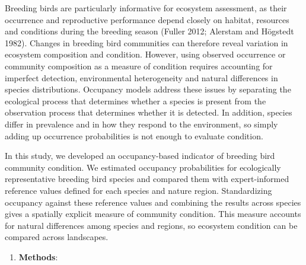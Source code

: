 \documentclass[
  letterpaper,
  DIV=11,
  numbers=noendperiod]{scrartcl}
\providecommand{\tightlist}{%
  \setlength{\itemsep}{0pt}\setlength{\parskip}{0pt}}
\begin{document}
Breeding birds are particularly informative for ecosystem assessment, as
their occurrence and reproductive performance depend closely on habitat,
resources and conditions during the breeding season (Fuller 2012;
Alerstam and Högstedt 1982). Changes in breeding bird communities can
therefore reveal variation in ecosystem composition and condition.
However, using observed occurrence or community composition as a measure
of condition requires accounting for imperfect detection, environmental
heterogeneity and natural differences in species distributions.
Occupancy models address these issues by separating the ecological
process that determines whether a species is present from the
observation process that determines whether it is detected. In addition,
species differ in prevalence and in how they respond to the environment,
so simply adding up occurrence probabilities is not enough to evaluate
condition.

In this study, we developed an occupancy-based indicator of breeding
bird community condition. We estimated occupancy probabilities for
ecologically representative breeding bird species and compared them with
expert-informed reference values defined for each species and nature
region. Standardizing occupancy against these reference values and
combining the results across species gives a spatially explicit measure
of community condition. This measure accounts for natural differences
among species and regions, so ecosystem condition can be compared across
landscapes.

\begin{enumerate}
\def\labelenumi{\arabic{enumi}.}
\setcounter{enumi}{1}
\tightlist
\item
  \textbf{Methods}:
\end{enumerate}
\end{document}
